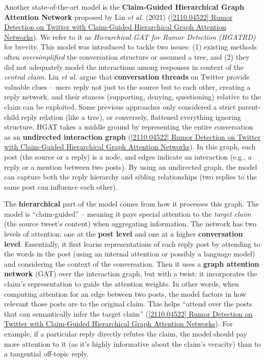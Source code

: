 \documentclass[12pt,a4paper]{report}
\begin{document}
Another state-of-the-art model is the \textbf{Claim-Guided Hierarchical Graph Attention Network} proposed by Lin \textit{et al.} (2021) (\href{https://arxiv.org/abs/2110.04522#:~:text=alleviating%20the%20negative%20impact%20imposed,for%20detecting%20rumors%20at%20early}{[2110.04522] Rumor Detection on Twitter with Claim-Guided Hierarchical Graph Attention Networks}). We refer to it as \textit{Hierarchical GAT for Rumor Detection (HGATRD)} for brevity. This model was introduced to tackle two issues: (1) existing methods often \textit{oversimplified} the conversation structure or assumed a tree, and (2) they did not adequately model the interactions among responses in context of the \textit{central claim}. Lin \textit{et al.} argue that \textbf{conversation threads} on Twitter provide valuable clues – users reply not just to the source but to each other, creating a reply network, and their stances (supporting, denying, questioning) relative to the claim can be exploited. Some previous approaches only considered a strict parent-child reply relation (like a tree), or conversely, flattened everything ignoring structure. HGAT takes a middle ground by representing the entire conversation as an \textbf{undirected interaction graph} (\href{https://arxiv.org/abs/2110.04522#:~:text=alleviating%20the%20negative%20impact%20imposed,for%20detecting%20rumors%20at%20early}{[2110.04522] Rumor Detection on Twitter with Claim-Guided Hierarchical Graph Attention Networks}). In this graph, each post (the source or a reply) is a node, and edges indicate an interaction (e.g., a reply or a mention between two posts). By using an undirected graph, the model can capture both the reply hierarchy and sibling relationships (two replies to the same post can influence each other).

The \textbf{hierarchical} part of the model comes from how it processes this graph. The model is “claim-guided” – meaning it pays special attention to the \textit{target claim} (the source tweet’s content) when aggregating information. The network has two levels of attention: one at the \textbf{post level} and one at a higher \textbf{conversation level}. Essentially, it first learns representations of each reply post by attending to the words in the post (using an internal attention or possibly a language model) and considering the context of the conversation. Then it uses a \textbf{graph attention network} (GAT) over the interaction graph, but with a twist: it incorporates the claim’s representation to guide the attention weights. In other words, when computing attention for an edge between two posts, the model factors in how relevant those posts are to the original claim. This helps “attend over the posts that can semantically infer the target claim” (\href{https://arxiv.org/abs/2110.04522#:~:text=alleviating%20the%20negative%20impact%20imposed,for%20detecting%20rumors%20at%20early}{[2110.04522] Rumor Detection on Twitter with Claim-Guided Hierarchical Graph Attention Networks}). For example, if a particular reply directly refutes the claim, the model should pay more attention to it (as it’s highly informative about the claim’s veracity) than to a tangential off-topic reply.
\end{document}
